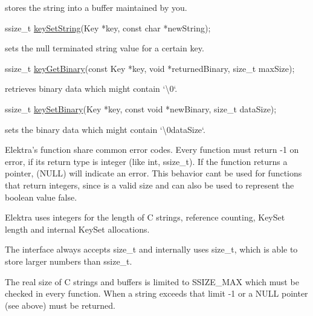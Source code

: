 stores the string into a buffer maintained by you.


\begin{DoxyCode}
ssize\_t \hyperlink{group__keyvalue_ga622bde1eb0e0c4994728331326340ef2}{keySetString}(Key *key, \textcolor{keyword}{const} \textcolor{keywordtype}{char} *newString);
\end{DoxyCode}


sets the null terminated string value for a certain key.


\begin{DoxyCode}
ssize\_t \hyperlink{group__keyvalue_ga4c0d8a4a11174197699c231e0b5c3c84}{keyGetBinary}(\textcolor{keyword}{const} Key *key, \textcolor{keywordtype}{void} *returnedBinary, \textcolor{keywordtype}{size\_t} maxSize);
\end{DoxyCode}


retrieves binary data which might contain `\textquotesingle{}\textbackslash{}0\textquotesingle{}`.


\begin{DoxyCode}
ssize\_t \hyperlink{group__keyvalue_gaa50a5358fd328d373a45f395fa1b99e7}{keySetBinary}(Key *key, \textcolor{keyword}{const} \textcolor{keywordtype}{void} *newBinary, \textcolor{keywordtype}{size\_t} dataSize);
\end{DoxyCode}


sets the binary data which might contain `\textquotesingle{}\textbackslash{}0data\+Size`.

Elektra’s function share common error codes. Every function must return {\ttfamily -\/1} on error, if its return type is integer (like {\ttfamily int}, {\ttfamily ssize\+\_\+t}). If the function returns a pointer, {} ({\ttfamily N\+U\+LL}) will indicate an error. This behavior can\textquotesingle{}t be used for functions that return integers, since {} is a valid size and can also be used to represent the boolean value {\ttfamily false}.

Elektra uses integers for the length of C strings, reference counting, {\ttfamily Key\+Set} length and internal {\ttfamily Key\+Set} allocations.

The interface always accepts {\ttfamily size\+\_\+t} and internally uses {\ttfamily size\+\_\+t}, which is able to store larger numbers than {\ttfamily ssize\+\_\+t}.

The real size of C strings and buffers is limited to {\ttfamily S\+S\+I\+Z\+E\+\_\+\+M\+AX} which must be checked in every function. When a string exceeds that limit {\ttfamily -\/1} or a {\ttfamily N\+U\+LL} pointer (see above) must be returned.

